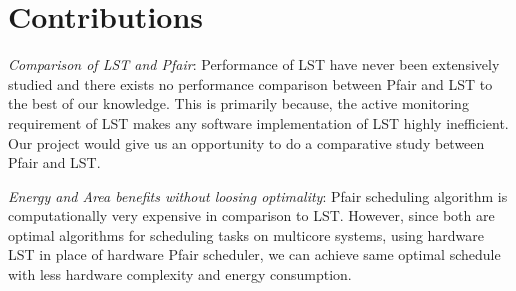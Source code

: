 \section{Contributions}

\textit{Comparison of LST and Pfair}: Performance of LST have never been
extensively studied and there exists no performance comparison between Pfair and
LST to the best of our knowledge. This is primarily because, the active
monitoring requirement of LST makes any software implementation of LST highly
inefficient. Our project would give us an opportunity to do a comparative study between
Pfair and LST.

\textit{Energy and Area benefits without loosing optimality}: Pfair scheduling algorithm
is computationally very expensive in comparison to LST. However, since both are
optimal algorithms for scheduling tasks on multicore systems, using hardware LST
in  place of hardware Pfair scheduler, we can achieve same optimal schedule with less
hardware complexity and energy consumption.

